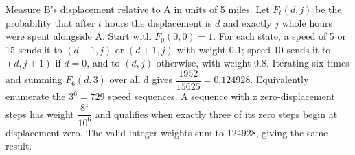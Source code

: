 Measure B's displacement relative to A in units of 5 miles. Let $F_t(d,j)$ be the probability that after $t$ hours the displacement is $d$ and exactly $j$ whole hours were spent alongside A. Start with $F_0(0,0)=1$. For each state, a speed of 5 or 15 sends it to $(d-1,j)$ or $(d+1,j)$ with weight $0.1$; speed 10 sends it to $(d,j+1)$ if $d=0$, and to $(d,j)$ otherwise, with weight $0.8$. Iterating six times and summing $F_6(d,3)$ over all d gives $\boxed{\dfrac{1952}{15625}}=0.124928$. Equivalently enumerate the $3^6=729$ speed sequences. A sequence with z zero-displacement steps has weight $\dfrac{8^z}{10^6}$ and qualifies when exactly three of its zero steps begin at displacement zero. The valid integer weights sum to 124928, giving the same result.
